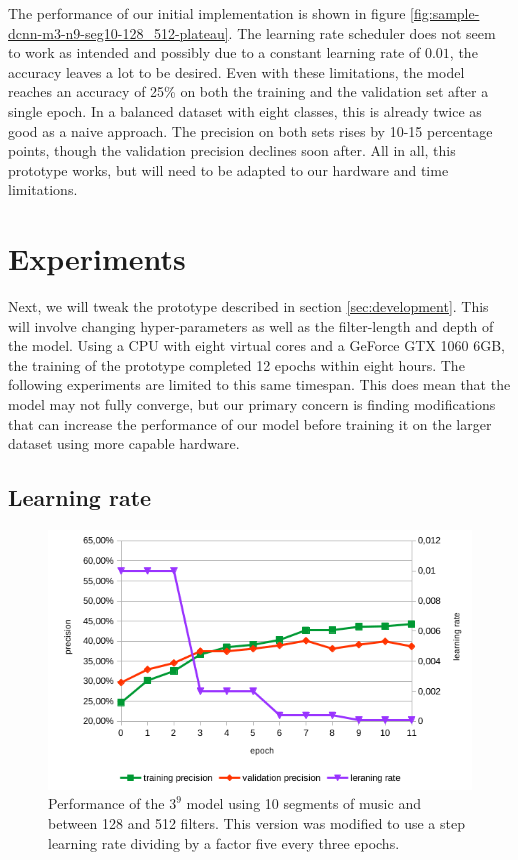 The performance of our initial implementation is shown in figure \ref{fig:sample-dcnn-m3-n9-seg10-128_512-plateau}. The learning rate scheduler does not seem to work as intended and possibly due to a constant learning rate of $0.01$, the accuracy leaves a lot to be desired. Even with these limitations, the model reaches an accuracy of 25\% on both the training and the validation set after a single epoch. In a balanced dataset with eight classes, this is already twice as good as a naive approach. The precision on both sets rises by 10-15 percentage points, though the validation precision declines soon after. All in all, this prototype works, but will need to be adapted to our hardware and time limitations.


\section{Experiments}
\label{sec:experiments}

Next, we will tweak the prototype described in section \ref{sec:development}. This will involve changing hyper-parameters as well as the filter-length and depth of the model. Using a CPU with eight virtual cores and a GeForce GTX 1060 6GB, the training of the prototype completed 12 epochs within eight hours. The following experiments are limited to this same timespan. This does mean that the model may not fully converge, but our primary concern is finding modifications that can increase the performance of our model before training it on the larger dataset using more capable hardware. 

\subsection{Learning rate}

\label{subsec:learning_rate}
\begin{figure}[!htb]
	\centering
	\includegraphics[width=.9\linewidth]{images/sample-dcnn-m3-n9-seg10-128_512-step.png}
	\caption{Performance of the $3^9$ model using 10 segments of music and between 128 and 512 filters. This version was modified to use a step learning rate dividing by a factor five every three epochs.}
	\label{fig:sample-dcnn-m3-n9-seg10-128_512-step}
\end{figure}

